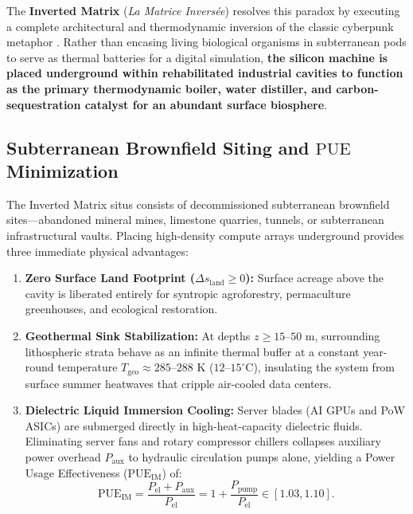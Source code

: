 \documentclass[aps,pre,twocolumn,10pt,superscriptaddress,amsmath,amssymb,amsfonts,floatfix,showkeys]{revtex4-2}
\begin{document}
The \textbf{Inverted Matrix} (\textit{La Matrice Invers\'ee}) resolves this paradox by executing a complete architectural and thermodynamic inversion of the classic cyberpunk metaphor \cite{RanaoraSunStandard}. Rather than encasing living biological organisms in subterranean pods to serve as thermal batteries for a digital simulation, \textbf{the silicon machine is placed underground within rehabilitated industrial cavities to function as the primary thermodynamic boiler, water distiller, and carbon-sequestration catalyst for an abundant surface biosphere}.

\subsection{Subterranean Brownfield Siting and \texorpdfstring{$\text{PUE}$}{PUE} Minimization}

The Inverted Matrix situs consists of decommissioned subterranean brownfield sites---abandoned mineral mines, limestone quarries, tunnels, or subterranean infrastructural vaults. Placing high-density compute arrays underground provides three immediate physical advantages:
\begin{enumerate}
    \item \textbf{Zero Surface Land Footprint ($\Delta s_{\text{land}} \ge 0$):} Surface acreage above the cavity is liberated entirely for syntropic agroforestry, permaculture greenhouses, and ecological restoration.
    \item \textbf{Geothermal Sink Stabilization:} At depths $z \ge 15\text{--}50\text{ m}$, surrounding lithospheric strata behave as an infinite thermal buffer at a constant year-round temperature $T_{\text{geo}} \approx 285\text{--}288\text{ K}$ ($12\text{--}15^\circ\text{C}$), insulating the system from surface summer heatwaves that cripple air-cooled data centers.
    \item \textbf{Dielectric Liquid Immersion Cooling:} Server blades (AI GPUs and PoW ASICs) are submerged directly in high-heat-capacity dielectric fluids. Eliminating server fans and rotary compressor chillers collapses auxiliary power overhead $P_{\text{aux}}$ to hydraulic circulation pumps alone, yielding a Power Usage Effectiveness ($\text{PUE}_{\text{IM}}$) of:
    \begin{equation}
        \text{PUE}_{\text{IM}} = \frac{P_{\text{el}} + P_{\text{aux}}}{P_{\text{el}}} = 1 + \frac{P_{\text{pump}}}{P_{\text{el}}} \in [1.03, 1.10].
        \label{eq:pue_derivation}
    \end{equation}
\end{enumerate}
\end{document}
